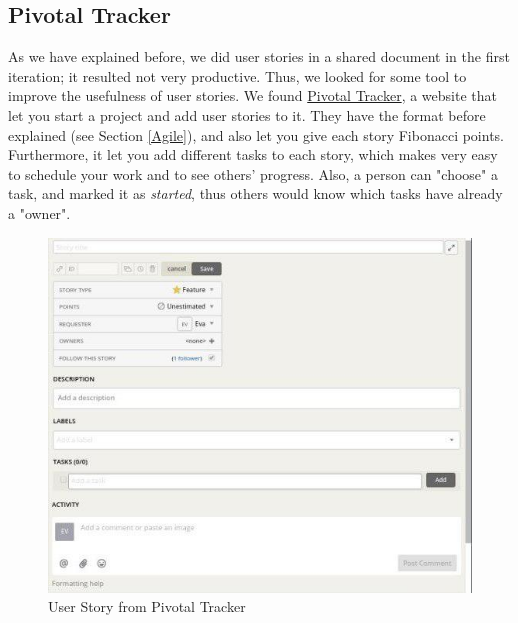 	\subsection{Pivotal Tracker} \label{Pivotal_Tracker}
	\vspace{-5mm}
As we have explained before, we did user stories in a shared document in the first iteration; it resulted not very productive. Thus, we looked for some tool to improve the usefulness of user stories. We found \href{https://www.pivotaltracker.com/}{Pivotal Tracker}, a website that let you start a project and add user stories to it. They have the format before explained (see Section \ref{Agile}), and also let you give each story Fibonacci points. Furthermore, it let you add different tasks to each story, which makes very easy to schedule your work and to see others' progress. Also, a person can "choose" a task, and marked it as \textit{started}, thus others would know which tasks have already a "owner".
\begin{figure}[H]
	\centering
	\includegraphics[trim={0 0 0 0},clip,width=1\textwidth]{Files/user_story.jpg}
	\caption{User Story from Pivotal Tracker}
	\label{fig: MVC}
\end{figure}


